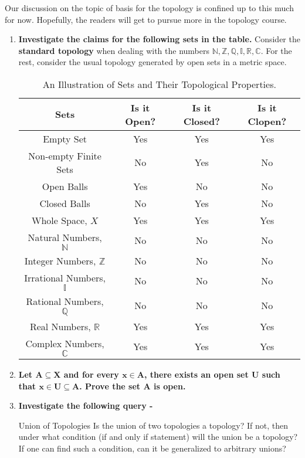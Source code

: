 \noindent Our discussion on the topic of basis for the topology is confined up to this much for now. Hopefully, the readers will get to pursue more in the topology course.
\exercise
\begin{enumerate}[label=\textbf{\arabic*.}]
    \item \textbf{Investigate the claims for the following sets in the table.} Consider the \textbf{standard topology} when dealing with the numbers $\mathbb{N, Z, Q, I, R, C}$. For the rest, consider the usual topology generated by open sets in a metric space.
    \begin{table}[H]
        \centering
        \begin{tabular}{|c|c|c|c|}
        \hline
        \textbf{Sets} & \textbf{Is it Open?} & \textbf{Is it Closed?} & \textbf{Is it Clopen?} \\ \hline
        Empty Set & Yes & Yes & Yes \\ \hline
        Non-empty Finite Sets & No & Yes & No \\ \hline
        Open Balls & Yes & No & No \\ \hline
        Closed Balls & No & Yes & No \\ \hline
        Whole Space, $X$ & Yes & Yes & Yes \\ \hline
        Natural Numbers, $\mathbb{N}$ & No & No & No\\ \hline
        Integer Numbers, $\mathbb{Z}$ & No & No & No \\ \hline
        Irrational Numbers, $\mathbb{I}$ & No & No & No \\ \hline
        Rational Numbers, $\mathbb{Q}$ & No & No & No\\ \hline
        Real Numbers, $\mathbb{R}$ & Yes & Yes & Yes \\ \hline
        Complex Numbers, $\mathbb{C}$ & Yes & Yes & Yes \\ \hline
        \end{tabular}
        \caption{An Illustration of Sets and Their Topological Properties.}
        \label{tab:open_closed_table}
    \end{table}
    \item \textbf{Let $\pmb{A\subseteq X}$ and for every $\pmb{x\in A}$, there exists an open set $\pmb{U}$ such that $\pmb{x\in U\subseteq A}$. Prove the set $\pmb{A}$ is open.}
    \item \textbf{Investigate the following query -}
    \begin{Query}{Union of Topologies}\label{union_topology}
        Is the union of two topologies a topology? If not, then under what condition (if and only if statement) will the union be a topology? If one can find such a condition, can it be generalized to arbitrary unions?\\

\end{Query}
\end{enumerate}
